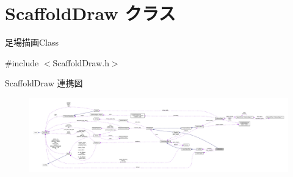 \hypertarget{class_scaffold_draw}{}\section{Scaffold\+Draw クラス}
\label{class_scaffold_draw}


足場描画\+Class  




{\ttfamily \#include $<$Scaffold\+Draw.\+h$>$}



Scaffold\+Draw 連携図\nopagebreak
\begin{figure}[H]
\begin{center}
\leavevmode
\includegraphics[width=350pt]{class_scaffold_draw__coll__graph}
\end{center}
\end{figure}
